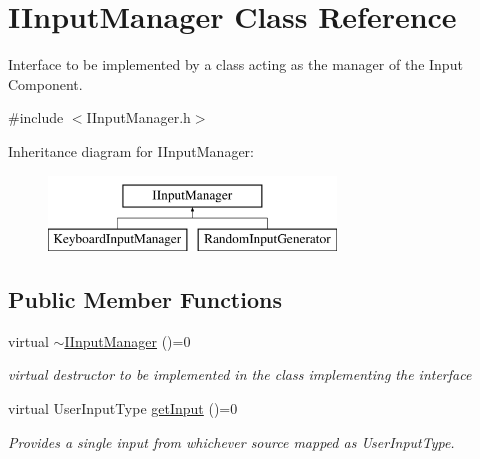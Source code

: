 \hypertarget{class_i_input_manager}{}\section{I\+Input\+Manager Class Reference}
\label{class_i_input_manager}


Interface to be implemented by a class acting as the manager of the Input Component.  




{\ttfamily \#include $<$I\+Input\+Manager.\+h$>$}

Inheritance diagram for I\+Input\+Manager\+:\begin{figure}[H]
\begin{center}
\leavevmode
\includegraphics[height=2.000000cm]{class_i_input_manager}
\end{center}
\end{figure}
\subsection*{Public Member Functions}
\begin{DoxyCompactItemize}
\item 
\mbox{\label{class_i_input_manager_aa81a10b1ddf305df10c4aebe6930ac86}} 
virtual \mbox{\hyperlink{class_i_input_manager_aa81a10b1ddf305df10c4aebe6930ac86}{$\sim$\+I\+Input\+Manager}} ()=0
\begin{DoxyCompactList}\small\item\em virtual destructor to be implemented in the class implementing the interface \end{DoxyCompactList}\item 
\mbox{\label{class_i_input_manager_afa367fc9694f45150aeb59039dcd4421}} 
virtual User\+Input\+Type \mbox{\hyperlink{class_i_input_manager_afa367fc9694f45150aeb59039dcd4421}{get\+Input}} ()=0
\begin{DoxyCompactList}\small\item\em Provides a single input from whichever source mapped as User\+Input\+Type. \end{DoxyCompactList}\end{DoxyCompactItemize}


